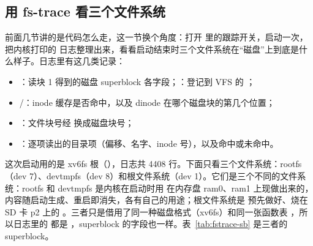 \subsection{用 fs-trace 看三个文件系统}
\label{sec:fs-trace}

前面几节讲的是代码怎么走，这一节换个角度：打开  里的跟踪开关，启动一次，把内核打印的  日志整理出来，看看启动结束时三个文件系统在“磁盘”上到底是什么样子。日志里有这几类记录：

\begin{itemize}
  \item {}：读块 1 得到的磁盘 superblock 各字段；：登记到 VFS 的 ；
  \item {}/：inode 缓存是否命中，以及 dinode 在哪个磁盘块的第几个位置；
  \item {}：文件块号经  换成磁盘块号；
  \item {}：逐项读出的目录项（偏移、名字、inode 号），以及命中或未命中。
\end{itemize}

这次启动用的是 xv6fs 根（），日志共 4408 行。下面只看三个文件系统：rootfs（dev 7）、devtmpfs（dev 8）和根文件系统（dev 1）。它们是三个不同的文件系统：rootfs 和 devtmpfs 是内核在启动时用  在内存盘 ram0、ram1 上现做出来的，内容随启动生成、重启即消失，各有自己的用途；根文件系统是  预先做好、烧在 SD 卡 p2 上的 。三者只是借用了同一种磁盘格式（xv6fs）和同一张函数表 ，所以日志里的  都是 ，superblock 的字段也一样。表~\ref{tab:fstrace-sb} 是三者的 superblock。

